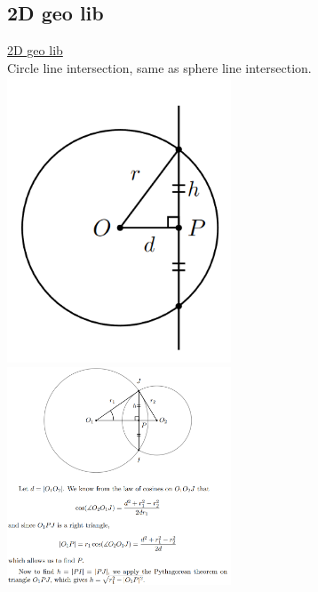 \documentclass[8pt, a4paper, oneside, twocolumn]{extarticle}
\begin{document}
\subsection{2D geo lib}
\href{https://github.com/sourabh2311/Competitive-Programming/blob/master/Libs/2dgeoLib.cpp}{2D geo lib}
\\Circle line intersection, same as sphere line intersection.\\
\includegraphics[width=0.5\textwidth,height=0.5\textheight,keepaspectratio]{circleline}
\\\includegraphics[width=0.5\textwidth,height=0.5\textheight,keepaspectratio]{circlecircle}
\end{document}

